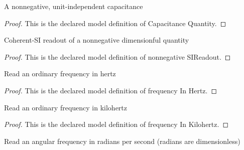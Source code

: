 \begin{definition}
  \label{def:physics:phyx-mini-0887:phyxminiproblems-problemphyxmini0887-capacitancequantity}
  A nonnegative, unit-independent capacitance
\end{definition}
\begin{proof}
  This is the declared model definition of Capacitance Quantity.
\end{proof}
\begin{definition}
  \label{def:physics:phyx-mini-0887:phyxminiproblems-problemphyxmini0887-nonnegativesireadout}
  Coherent-SI readout of a nonnegative dimensionful quantity
\end{definition}
\begin{proof}
  This is the declared model definition of nonnegative SIReadout.
\end{proof}
\begin{definition}
  \label{def:physics:phyx-mini-0887:phyxminiproblems-problemphyxmini0887-frequencyinhertz}
  Read an ordinary frequency in hertz
\end{definition}
\begin{proof}
  This is the declared model definition of frequency In Hertz.
\end{proof}
\begin{definition}
  \label{def:physics:phyx-mini-0887:phyxminiproblems-problemphyxmini0887-frequencyinkilohertz}
  Read an ordinary frequency in kilohertz
\end{definition}
\begin{proof}
  This is the declared model definition of frequency In Kilohertz.
\end{proof}
\begin{definition}
  \label{def:physics:phyx-mini-0887:phyxminiproblems-problemphyxmini0887-angularfrequencyinradianspersecond}
  Read an angular frequency in radians per second (radians are dimensionless)
\end{definition}
